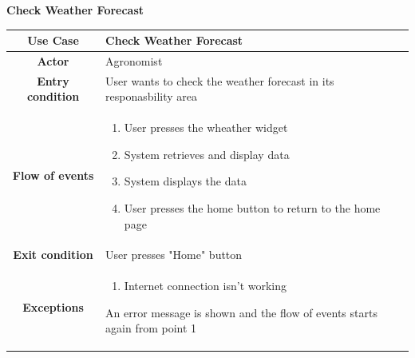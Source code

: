 \documentclass[table, 12pt]{article}
\begin{document}
\begin{itemize}
            \begin{table}[H]
                \item[] \textbf{Check Weather Forecast}
                \item[] 
                \centering
                \begin{tabular}{|c |m{}|}
                    \hline
                    \textbf{Use Case} & Check Weather Forecast\\ \hline
                    \textbf{Actor} & Agronomist\\ \hline
                    \textbf{Entry condition} & User wants to check the weather forecast in its responasbility area \\  \hline
                    \textbf{Flow of events} & \begin{enumerate}
                                                \item User presses the wheather widget
                                                \item System retrieves and display data 
                                                \item System displays the data
                                                \item User presses the home button to return to the home page
                                            \end{enumerate}\\ \hline
                    \textbf{Exit condition} & User presses "Home" button\\ \hline
                    \textbf{Exceptions} &\begin{enumerate}
                        \item Internet connection isn't working
                    \end{enumerate}
                    An error message is shown and the flow of events starts again from point 1 \\ \hline                    
                \end{tabular}
            \end{table}


\end{itemize}
\end{document}
